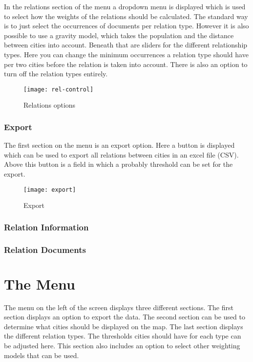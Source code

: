 In the relations section of the menu a dropdown menu is displayed which is used to select how the weights of the relations should be calculated. The standard way is to just select the occurrences of documents per relation type. However it is also possible to use a gravity model, which takes the population and the distance between cities into account.  Beneath that are sliders for the different relationship types. Here you can change the minimum occurrences a relation type should have per two cities before the relation is taken into account. There is also an option to turn off the relation types entirely.

\begin{figure}[H]
    \centering
    \texttt{[image: rel-control]}
    \caption{Relations options}
    \label{fig:rel-control}
\end{figure}

\subsubsection{Export}
The first section on the menu is an export option. Here a button is displayed which can be used to export all relations between cities in an excel file (CSV). Above this button is a field in which a probably threshold can be set for the export. 

\begin{figure}[H]
    \centering
    \texttt{[image: export]}
    \caption{Export}
    \label{fig:infoflow}
\end{figure}

\subsubsection{Relation Information}\label{sec:rel-info}
\subsubsection{Relation Documents}


\section{The Menu}
The menu on the left of the screen displays three different sections. The first section displays an option to export the data. The second section can be used to determine what cities should be displayed on the map. The last section displays the different relation types. The thresholds cities should have for each type can be adjusted here. This section also includes an option to select other weighting models that can be used.


